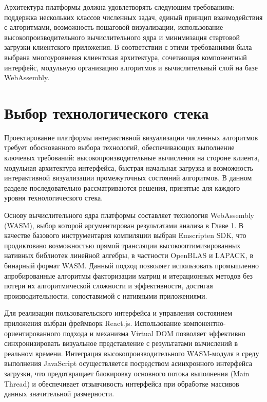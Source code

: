 \documentclass[12pt, oneside]{book}
\begin{document}
    \quad Архитектура платформы должна удовлетворять следующим требованиям: поддержка нескольких классов численных задач, единый принцип взаимодействия с алгоритмами, возможность пошаговой визуализации, использование высокопроизводительного вычислительного ядра и минимизация стартовой загрузки клиентского приложения. В соответствии с этими требованиями была выбрана многоуровневая клиентская архитектура, сочетающая компонентный интерфейс, модульную организацию алгоритмов и вычислительный слой на базе WebAssembly.



\section{Выбор технологического стека}

    \quad Проектирование платформы интерактивной визуализации численных алгоритмов требует обоснованного выбора технологий, обеспечивающих выполнение ключевых требований: высокопроизводительные вычисления на стороне клиента, модульная архитектура интерфейса, быстрая начальная загрузка и возможность интерактивной визуализации промежуточных состояний алгоритмов. В данном разделе последовательно рассматриваются решения, принятые для каждого уровня технологического стека.

    \quad Основу вычислительного ядра платформы составляет технология WebAssembly (WASM), выбор которой аргументирован результатами анализа в Главе 1. В качестве базового инструментария компиляции выбран Emscripten SDK, что продиктовано возможностью прямой трансляции высокооптимизированных нативных библиотек линейной алгебры, в частности OpenBLAS и LAPACK, в бинарный формат WASM. Данный подход позволяет использовать промышленно апробированные алгоритмы факторизации матриц и итерационных методов без потери их алгоритмической сложности и эффективности, достигая производительности, сопоставимой с нативными приложениями.

    \quad Для реализации пользовательского интерфейса и управления состоянием приложения выбран фреймворк React.js. Использование компонентно-ориентированного подхода и механизма Virtual DOM позволяет эффективно синхронизировать визуальное представление с результатами вычислений в реальном времени. Интеграция высокопроизводительного WASM-модуля в среду выполнения JavaScript осуществляется посредством асинхронного интерфейса загрузки, что предотвращает блокировку основного потока выполнения (Main Thread) и обеспечивает отзывчивость интерфейса при обработке массивов данных значительной размерности.
\end{document}
